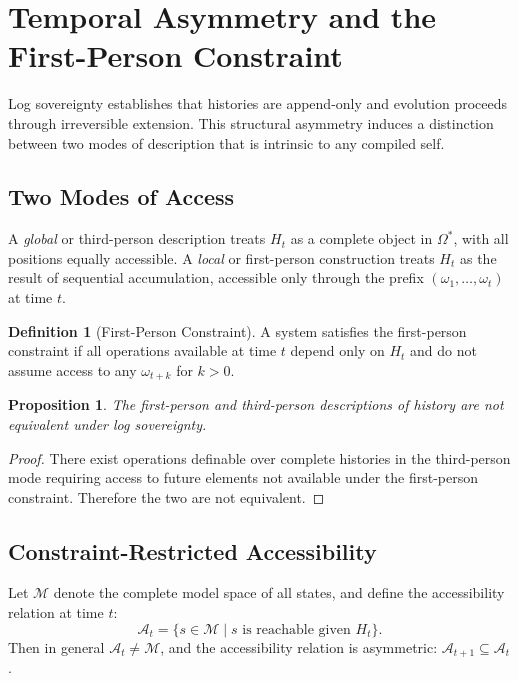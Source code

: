 \documentclass[12pt, a4paper]{article}
\theoremstyle{plain}
\newtheorem{proposition}[theorem]{Proposition}
\theoremstyle{definition}
\newtheorem{definition}[theorem]{Definition}
\theoremstyle{remark}
\begin{document}
\section{Temporal Asymmetry and the First-Person Constraint}

Log sovereignty establishes that histories are append-only and evolution proceeds through irreversible extension. This structural asymmetry induces a distinction between two modes of description that is intrinsic to any compiled self.

\subsection{Two Modes of Access}

A \emph{global} or third-person description treats $H_t$ as a complete object in $\Omega^*$, with all positions equally accessible. A \emph{local} or first-person construction treats $H_t$ as the result of sequential accumulation, accessible only through the prefix $(\omega_1, \dots, \omega_t)$ at time $t$.

\begin{definition}[First-Person Constraint]
A system satisfies the first-person constraint if all operations available at time $t$ depend only on $H_t$ and do not assume access to any $\omega_{t+k}$ for $k > 0$.
\end{definition}

\begin{proposition}
The first-person and third-person descriptions of history are not equivalent under log sovereignty.
\end{proposition}

\begin{proof}
There exist operations definable over complete histories in the third-person mode requiring access to future elements not available under the first-person constraint. Therefore the two are not equivalent.
\end{proof}

\subsection{Constraint-Restricted Accessibility}

Let $\mathcal{M}$ denote the complete model space of all states, and define the accessibility relation at time $t$:
\[
\mathcal{A}_t = \{ s \in \mathcal{M} \mid s \text{ is reachable given } H_t \}.
\]
Then in general $\mathcal{A}_t \neq \mathcal{M}$, and the accessibility relation is asymmetric: $\mathcal{A}_{t+1} \subseteq \mathcal{A}_t$.
\end{document}
